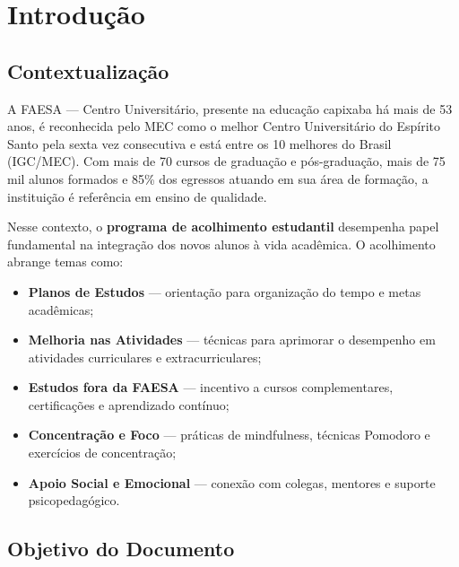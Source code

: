 \documentclass[12pt, a4paper]{article}
\begin{document}
\newpage
\tableofcontents
\newpage

\section{Introdução}

\subsection{Contextualização}

A FAESA --- Centro Universitário, presente na educação capixaba há mais de 53 anos, é reconhecida pelo MEC como o melhor Centro Universitário do Espírito Santo pela sexta vez consecutiva e está entre os 10 melhores do Brasil (IGC/MEC). Com mais de 70 cursos de graduação e pós-graduação, mais de 75 mil alunos formados e 85\% dos egressos atuando em sua área de formação, a instituição é referência em ensino de qualidade.

Nesse contexto, o \textbf{programa de acolhimento estudantil} desempenha papel fundamental na integração dos novos alunos à vida acadêmica. O acolhimento abrange temas como:

\begin{itemize}[leftmargin=2cm]
    \item[\faIcon{book}] \textbf{Planos de Estudos} --- orientação para organização do tempo e metas acadêmicas;
    \item[\faIcon{chart-line}] \textbf{Melhoria nas Atividades} --- técnicas para aprimorar o desempenho em atividades curriculares e extracurriculares;
    \item[\faIcon{graduation-cap}] \textbf{Estudos fora da FAESA} --- incentivo a cursos complementares, certificações e aprendizado contínuo;
    \item[\faIcon{brain}] \textbf{Concentração e Foco} --- práticas de mindfulness, técnicas Pomodoro e exercícios de concentração;
    \item[\faIcon{users}] \textbf{Apoio Social e Emocional} --- conexão com colegas, mentores e suporte psicopedagógico.
\end{itemize}

\subsection{Objetivo do Documento}
\end{document}

